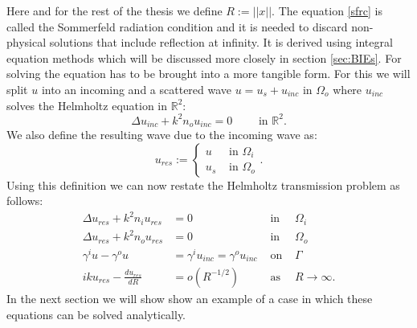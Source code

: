 \documentclass[a4paper, oneside]{thirdparty_stylesheets/discothesis}
\begin{document}
Here and for the rest of the thesis we define $R := ||x||$.
The equation \ref{sfrc} is called the Sommerfeld radiation condition and it is needed to discard non-physical solutions that include reflection at infinity. 
It is derived using integral equation methods which will be discussed more closely in section \ref{sec:BIEs}.
For solving the equation has to be brought into a more tangible form.
For this we will split $u$ into an incoming and a scattered wave $u = u_{s} + u_{inc}$ in $\Omega_o$ where $u_{inc}$ solves the Helmholtz equation in $\mathbb{R}^2$:
\begin{equation}
	\Delta u_{inc} + k^2n_ou_{inc} = 0 \qquad \text{ in } \mathbb{R}^2. \label{hme1}
\end{equation}
We also define the resulting wave due to the incoming wave as:
\begin{equation}
	u_{res} := 
	\begin{cases}
		u &\text{ in } \Omega_i \\
		u_s &\text{ in } \Omega_o
	\end{cases}
	.
\end{equation}
Using this definition we can now restate the Helmholtz transmission problem as follows:
\begin{align}
	\Delta u_{res} + k^2n_iu_{res} &= 0 & \text{ in }& \Omega_i \label{hme2}\\
	\Delta u_{res} + k^2n_ou_{res} &= 0 & \text{ in }& \Omega_o \label{hme3}\\
	\gamma^iu - \gamma^ou&= \gamma^iu_{inc} = \gamma^ou_{inc} & \text{ on }& \Gamma \label{bc}\\
	iku_{res} - \frac{du_{res}}{dR} &= o(R^{-1/2}) & \text{ as }& R \rightarrow \infty.
\end{align}
In the next section we will show show an example of a case in which these equations can be solved analytically.
\end{document}
